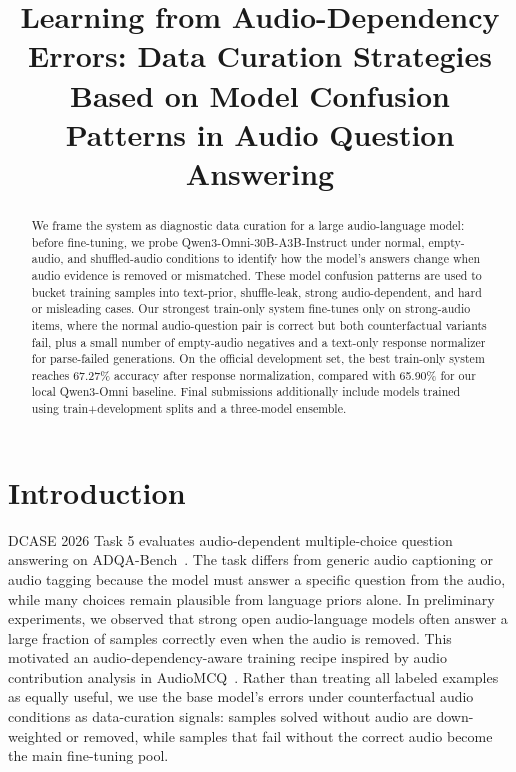 \documentclass{article}
\title{Learning from Audio-Dependency Errors: Data Curation Strategies Based on Model Confusion Patterns in Audio Question Answering}
\begin{document}
\maketitle

\begin{abstract}
We frame the system as diagnostic data curation for a large audio-language model: before fine-tuning, we probe Qwen3-Omni-30B-A3B-Instruct under normal, empty-audio, and shuffled-audio conditions to identify how the model's answers change when audio evidence is removed or mismatched.
These model confusion patterns are used to bucket training samples into text-prior, shuffle-leak, strong audio-dependent, and hard or misleading cases.
Our strongest train-only system fine-tunes only on strong-audio items, where the normal audio-question pair is correct but both counterfactual variants fail, plus a small number of empty-audio negatives and a text-only response normalizer for parse-failed generations.
On the official development set, the best train-only system reaches 67.27\% accuracy after response normalization, compared with 65.90\% for our local Qwen3-Omni baseline.
Final submissions additionally include models trained using train+development splits and a three-model ensemble.
\end{abstract}

\vspace{-10pt}

\section{Introduction}
\vspace{-10pt}
DCASE 2026 Task 5 evaluates audio-dependent multiple-choice question answering on ADQA-Bench~\cite{dcase2026task5}.
The task differs from generic audio captioning or audio tagging because the model must answer a specific question from the audio, while many choices remain plausible from language priors alone.
In preliminary experiments, we observed that strong open audio-language models often answer a large fraction of samples correctly even when the audio is removed.
This motivated an audio-dependency-aware training recipe inspired by audio contribution analysis in AudioMCQ~\cite{he2026audiomcq}.
Rather than treating all labeled examples as equally useful, we use the base model's errors under counterfactual audio conditions as data-curation signals: samples solved without audio are down-weighted or removed, while samples that fail without the correct audio become the main fine-tuning pool.
\end{document}
